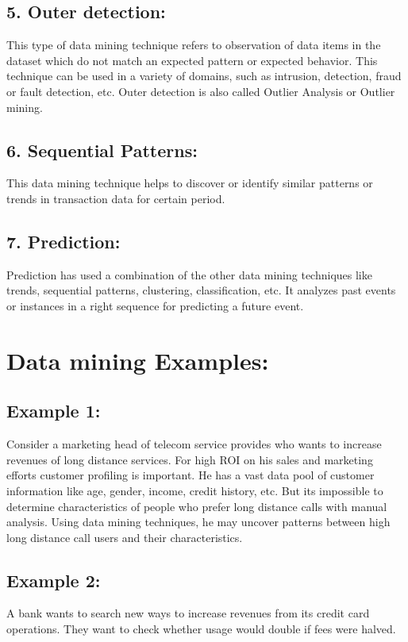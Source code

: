 \documentclass[a4paper,10pt]{article}
\begin{document}
\subsection*{5. Outer detection:}
This type of data mining technique refers to observation of data items in the dataset which do not match an expected pattern or expected behavior. This technique can be used in a variety of domains, such as intrusion, detection, fraud or fault detection, etc. Outer detection is also called Outlier Analysis or Outlier mining.

\subsection*{6. Sequential Patterns:}
This data mining technique helps to discover or identify similar patterns or trends in transaction data for certain period.

\subsection*{7. Prediction:}
Prediction has used a combination of the other data mining techniques like trends, sequential patterns, clustering, classification, etc. It analyzes past events or instances in a right sequence for predicting a future event.

\section{Data mining Examples:}
\subsection*{Example 1:}
Consider a marketing head of telecom service provides who wants to increase revenues of long distance services. For high ROI on his 
sales and marketing efforts customer profiling is important. He has a vast data pool of customer information like age, gender, income, credit history, etc. But its impossible to determine characteristics of people who prefer long distance calls with manual analysis. Using data mining techniques, he may uncover patterns between high long distance call users and their characteristics.

\subsection*{Example 2:}
A bank wants to search new ways to increase revenues from its credit card operations. They want to check whether usage would double if fees were halved.
\end{document}
